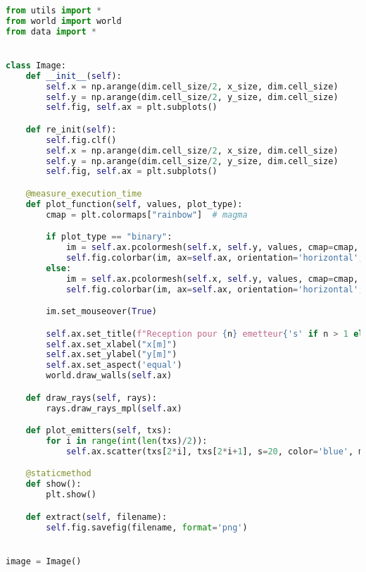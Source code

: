 \begin{lstlisting}[language=python]
from utils import *
from world import world
from data import *


class Image:
    def __init__(self):
        self.x = np.arange(dim.cell_size/2, x_size, dim.cell_size)
        self.y = np.arange(dim.cell_size/2, y_size, dim.cell_size)
        self.fig, self.ax = plt.subplots()

    def re_init(self):
        self.fig.clf()
        self.x = np.arange(dim.cell_size/2, x_size, dim.cell_size)
        self.y = np.arange(dim.cell_size/2, y_size, dim.cell_size)
        self.fig, self.ax = plt.subplots()

    @measure_execution_time
    def plot_function(self, values, plot_type):
        cmap = plt.colormaps["rainbow"]  # magma

        if plot_type == "binary":
            im = self.ax.pcolormesh(self.x, self.y, values, cmap=cmap, shading='nearest', vmin=B_MIN, vmax=B_MAX)
            self.fig.colorbar(im, ax=self.ax, orientation='horizontal', label="Debit Binaire [Gb/s]")
        else:
            im = self.ax.pcolormesh(self.x, self.y, values, cmap=cmap, shading='nearest', vmin=-90, vmax=-40)
            self.fig.colorbar(im, ax=self.ax, orientation='horizontal', label="Power [dbm]")

        im.set_mouseover(True)

        self.ax.set_title(f"Reception pour {n} emetteur{'s' if n > 1 else ''}")
        self.ax.set_xlabel("x[m]")
        self.ax.set_ylabel("y[m]")
        self.ax.set_aspect('equal')
        world.draw_walls(self.ax)

    def draw_rays(self, rays):
        rays.draw_rays_mpl(self.ax)

    def plot_emitters(self, txs):
        for i in range(int(len(txs)/2)):
            self.ax.scatter(txs[2*i], txs[2*i+1], s=20, color='blue', marker="+")

    @staticmethod
    def show():
        plt.show()

    def extract(self, filename):
        self.fig.savefig(filename, format='png')


image = Image()

\end{lstlisting}